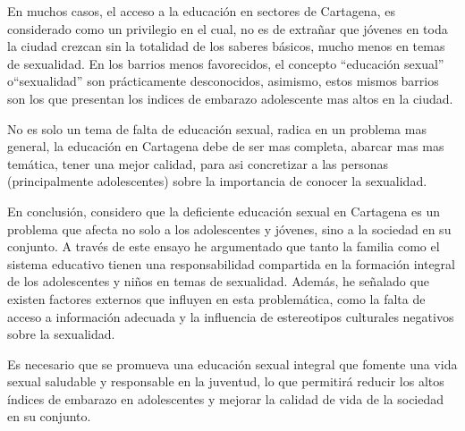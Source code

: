 \documentclass[letterpaper, 12pt]{article}
\begin{document}
En muchos casos, el acceso a la educación en sectores de
Cartagena, es considerado como un privilegio en el cual, no
es de extrañar que jóvenes en toda la ciudad crezcan sin la
totalidad de los saberes básicos, mucho menos en temas de
sexualidad. En los barrios menos favorecidos, el concepto
``educación sexual'' o``sexualidad'' son prácticamente
desconocidos, asimismo, estos mismos barrios son los que
presentan los indices de embarazo adolescente mas altos en
la ciudad.

No es solo un tema de falta de educación sexual, radica en
un problema mas general, la educación en Cartagena debe de
ser mas completa, abarcar mas mas temática, tener una mejor
calidad, para asi concretizar a las personas
(principalmente adolescentes) sobre la importancia de
conocer la sexualidad.


En conclusión, considero que la deficiente educación sexual
en Cartagena es un problema que afecta no solo a los
adolescentes y jóvenes, sino a la sociedad en su conjunto.
A través de este ensayo he argumentado que tanto la familia
como el sistema educativo tienen una responsabilidad
compartida en la formación integral de los adolescentes y
niños en temas de sexualidad. Además, he señalado que
existen factores externos que influyen en esta
problemática, como la falta de acceso a información
adecuada y la influencia de estereotipos culturales
negativos sobre la sexualidad.

Es necesario que se promueva una educación sexual integral
que fomente una vida sexual saludable y responsable en la
juventud, lo que permitirá reducir los altos índices de
embarazo en adolescentes y mejorar la calidad de vida de la
sociedad en su conjunto.

\newpage

\printbibliography
\end{document}
